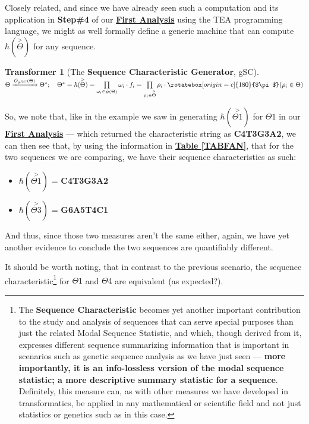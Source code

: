 \documentclass[a4paper, 18pt]{book} %
\newtheorem{transf}{Transformer}
\newcommand{\invpi}{\rotatebox[origin=c]{180}{$\pi$}}
\begin{document}
Closely related, and since we have already seen such a computation and its application in \textbf{Step\#4} of our \textbf{\hyperref[SECFANAL]{First Analysis}} using the TEA programming language, we might as well formally define a generic machine that can compute $\hbar(\overset{>}{\Theta})$ for any sequence.

\vspace{1em}
\begin{transf}[The \textbf{Sequence Characteristic Generator}, gSC]
\label{TRANSFGENSEQCHAR}
$ $\\
$\Theta \xrightarrow{O_{gSC}(\Theta)} \Theta^*; \quad \Theta^* = \hbar(\overset{>}{\Theta}) = \prod\limits_{\omega_i \in \psi(\Theta)} \omega_i\cdot f_i = \prod\limits_{\rho_i \in \overset{>}{\Theta}} \rho_i\cdot \invpi(\rho_i \in \Theta)$
\end{transf}
\vspace{1em}

So, we note that, like in the example we saw in generating $\hbar(\overset{>}{\Theta1})$ for $\Theta1$ in our \textbf{\hyperref[SECFANAL]{First Analysis}} --- which returned the characteristic string as \textbf{C4T3G3A2}, we can then see that, by using the information in \textbf{\hyperref[TABFAN]{Table \ref{TABFAN}}}, that for the two sequences we are comparing, we have their sequence characteristics as such:

\begin{itemize}
\item $\hbar(\overset{>}{\Theta1})$ = \textbf{C4T3G3A2}
\item $\hbar(\overset{>}{\Theta3})$ = \textbf{G6A5T4C1}
\end{itemize}

And thus, since those two measures aren't the same either, again, we have yet another evidence to conclude the two sequences are quantifiably different.

It should be worth noting, that in contrast to the previous scenario, the sequence characteristic\footnote{The \textbf{Sequence Characteristic} becomes yet another important contribution to the study and analysis of sequences that can serve special purposes than just the related Modal Sequence Statistic, and which, though derived from it, expresses different sequence summarizing information that is important in scenarios such as genetic sequence analysis as we have just seen --- \textbf{more importantly, it is an info-lossless version of the modal sequence statistic; a more descriptive summary statistic for a sequence}. Definitely, this measure can, as with other measures we have developed in transformatics, be applied in any mathematical or scientific field and not just statistics or genetics such as in this case.} for $\Theta1$ and $\Theta4$ are equivalent (as expected?).
\end{document}
